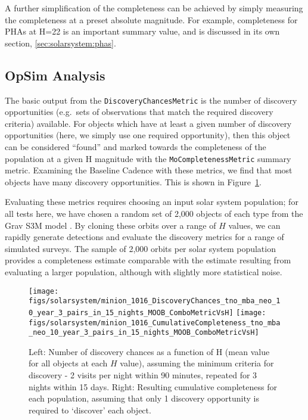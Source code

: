 A further simplification of the completeness can be achieved by simply
measuring the completeness at a preset absolute magnitude. For
example, completeness for PHAs at H=22 is an important summary value,
and is discussed in its own section, \ref{sec:solarsystem:phas}.



\subsection{OpSim Analysis}
\label{sec:\secname:analysis}

The basic output from the {\tt DiscoveryChancesMetric} is the number
of discovery opportunities (e.g.\ sets of observations that match the
required discovery criteria) available. For objects which have at
least a given number of discovery opportunities (here, we simply use
one required opportunity), then this object can be considered
``found'' and marked towards the completeness of the population at a
given H magnitude with the {\tt MoCompletenessMetric} summary metric.
Examining the  Baseline Cadence with these metrics,
we find that most objects have many discovery opportunities. This is shown in
Figure~\ref{standard_discovery}.

Evaluating these metrics requires choosing an input solar system population;
for all tests here, we have chosen a random set of 2,000 objects of each type from
the Grav S3M model \citep{2011PASP..123..423G}. By cloning these orbits over a
range of $H$ values, we can rapidly generate detections and evaluate the discovery
metrics for a range of simulated surveys. The sample of 2,000 orbits per solar system
population provides a completeness estimate comparable with the estimate
resulting from evaluating a larger population, although with slightly more
statistical noise.

\begin{figure}
\texttt{[image: figs/solarsystem/minion\_1016\_DiscoveryChances\_tno\_mba\_neo\_10\_year\_3\_pairs\_in\_15\_nights\_MOOB\_ComboMetricVsH]}
\texttt{[image: figs/solarsystem/minion\_1016\_CumulativeCompleteness\_tno\_mba\_neo\_10\_year\_3\_pairs\_in\_15\_nights\_MOOB\_ComboMetricVsH]}
\caption{Left: Number of discovery chances as a function of H
  (mean value for all objects at each $H$ value), assuming the minimum criteria for
  discovery - 2 visits per night within 90 minutes, repeated for 3
  nights within 15 days. Right: Resulting cumulative completeness for
  each population, assuming that only 1 discovery opportunity is
  required to `discover' each object.
\label{standard_discovery}}
\end{figure}

